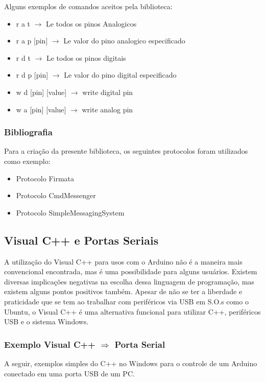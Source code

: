 Alguns exemplos de comandos aceitos pela biblioteca:

\begin{itemize} 
\item r a t $\to$ Le todos os pinos Analogicos
\item r a p [pin] $\to$ Le valor do pino analogico especificado
\item r d t $\to$ Le todos os pinos digitais
\item r d p [pin] $\to$ Le valor do pino digital especificado
\item w d [pin] [value] $\to$ write digital pin
\item w a [pin] [value] $\to$ write analog pin
\end{itemize}

\subsubsection{Bibliografia}

Para a criação da presente biblioteca, os seguintes protocolos foram utilizados como exemplo:

\begin{itemize}
\item  Protocolo Firmata
\item  Protocolo CmdMessenger
\item  Protocolo SimpleMessagingSystem
\end{itemize}

\subsection{Visual C++ e Portas Seriais}

A utilização do Visual C++ para usos com o Arduino não é a maneira mais convencional encontrada, mas é uma possibilidade para alguns usuários. Existem diversas implicações negativas na escolha dessa linguagem de programação, mas existem alguns pontos positivos também. Apesar de não se ter a liberdade e praticidade que se tem ao trabalhar com periféricos via USB em S.O.s como o Ubuntu, o Visual C++ é uma alternativa funcional para utilizar C++, periféricos USB e o sistema Windows.

\subsubsection{Exemplo Visual C++ $\Rightarrow$ Porta Serial}

A seguir, exemplos simples do C++ no Windows para o controle de um Arduino conectado em uma porta USB de um PC.

